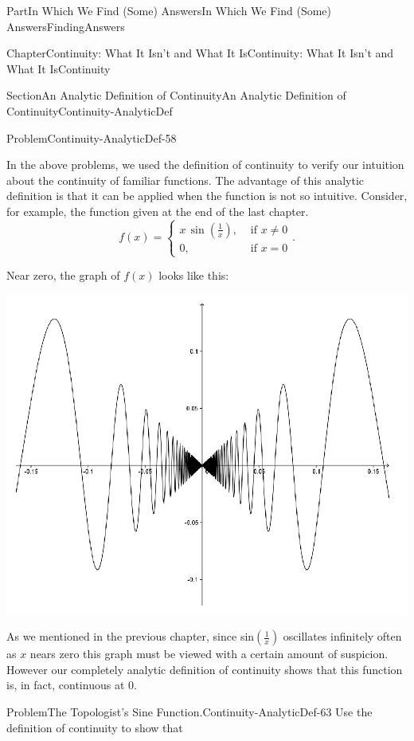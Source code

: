 \documentclass[oneside,10pt,]{book}
\numberwithin{equation}{part}
\newcommand{\amp}{&}
\begin{document}
\begin{partptx}{Part}{In Which We Find (Some) Answers}{}{In Which We Find (Some) Answers}{}{}{FindingAnswers}
\begin{chapterptx}{Chapter}{Continuity: What It Isn't and What It Is}{}{Continuity: What It Isn't and What It Is}{}{}{Continuity}
\begin{sectionptx}{Section}{An Analytic Definition of Continuity}{}{An Analytic Definition of Continuity}{}{}{Continuity-AnalyticDef}
\begin{problem}{Problem}{}{Continuity-AnalyticDef-58}
\begin{enumerate}[font=\bfseries,label=(\alph*),ref=\alph*]
\end{enumerate}%
\end{problem}
In the above problems, we used the definition of continuity to verify our intuition about the continuity of familiar functions.  The advantage of this analytic definition is that it can be applied when the function is not so intuitive.  Consider, for example, the function given at the end of the last chapter.%
\begin{equation*}
f(x)= \begin{cases}
x\,\sin\left(\frac{1}{x}\right),\amp \text{ if } x\neq 0\\
0, \amp \text{ if } x=0 
\end{cases}  \text{.}
\end{equation*}
%
\par
Near zero, the graph of \(f(x)\) looks like this:%
\begin{image}{0.125}{0.75}{0.125}{}%
\includegraphics[width=\linewidth]{external/images/Ch5fig4.png}
\end{image}%
As we mentioned in the previous chapter, since sin\(\left(\frac{1}{x}\right)\) oscillates infinitely often as \(x\) nears zero this graph must be viewed with a certain amount of suspicion.  However our completely analytic definition of continuity shows that this function is, in fact, continuous at 0.%
\begin{problem}{Problem}{The Topologist's Sine Function.}{Continuity-AnalyticDef-63}%
 Use the definition of continuity to show that%
\begin{equation*}

\end{equation*}
\end{problem}
\end{sectionptx}
\end{chapterptx}
\end{partptx}
\end{document}
